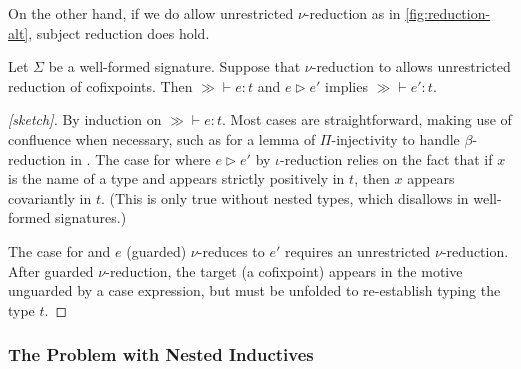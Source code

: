 On the other hand, if we do allow unrestricted $\nu$-reduction as in \autoref{fig:reduction-alt}, subject reduction does hold.

\begin{theorem}
  \label{thm:metatheory:sr}
  Let $\Sigma$ be a well-formed signature.
  Suppose that $\nu$-reduction to allows unrestricted reduction of cofixpoints.
  Then $\gg \vdash e : t$ and $e \rhd e'$ implies $\gg \vdash e' : t$.
\end{theorem}

\begin{proof}[{[sketch]}]
  By induction on $\gg \vdash e : t$.  Most cases are straightforward,
  making use of confluence when necessary, such as for a lemma of
  $\Pi$-injectivity to handle $\beta$-reduction in .
  The case for  where $e \rhd e'$ by $\iota$-reduction relies on the fact that
  if $x$ is the name of a \coinductive type and appears strictly positively in $t$,
  then $x$ appears covariantly in $t$.
  (This is only true without nested \coinductive types, which \lang disallows in well-formed signatures.)

  The case for  and $e$ (guarded) $\nu$-reduces to $e'$ requires an unrestricted $\nu$-reduction.
  After guarded $\nu$-reduction, the target (a cofixpoint) appears in the motive unguarded by a case expression, but must be unfolded to re-establish typing the type $t$.
\end{proof}

\subsubsection{The Problem with Nested Inductives}

\newcommand{\nat}{\const{N}}

